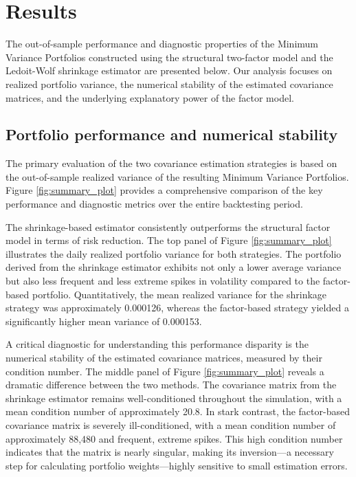 \documentclass[]{article}
\begin{document}
\section{Results}
\label{sec:results}
The out-of-sample performance and diagnostic properties of the Minimum Variance Portfolios constructed using the structural two-factor model and the Ledoit-Wolf shrinkage estimator are presented below. Our analysis focuses on realized portfolio variance, the numerical stability of the estimated covariance matrices, and the underlying explanatory power of the factor model.

\subsection{Portfolio performance and numerical stability}
The primary evaluation of the two covariance estimation strategies is based on the out-of-sample realized variance of the resulting Minimum Variance Portfolios. Figure \ref{fig:summary_plot} provides a comprehensive comparison of the key performance and diagnostic metrics over the entire backtesting period.

The shrinkage-based estimator consistently outperforms the structural factor model in terms of risk reduction. The top panel of Figure \ref{fig:summary_plot} illustrates the daily realized portfolio variance for both strategies. The portfolio derived from the shrinkage estimator exhibits not only a lower average variance but also less frequent and less extreme spikes in volatility compared to the factor-based portfolio. Quantitatively, the mean realized variance for the shrinkage strategy was approximately 0.000126, whereas the factor-based strategy yielded a significantly higher mean variance of 0.000153.

A critical diagnostic for understanding this performance disparity is the numerical stability of the estimated covariance matrices, measured by their condition number. The middle panel of Figure \ref{fig:summary_plot} reveals a dramatic difference between the two methods. The covariance matrix from the shrinkage estimator remains well-conditioned throughout the simulation, with a mean condition number of approximately 20.8. In stark contrast, the factor-based covariance matrix is severely ill-conditioned, with a mean condition number of approximately 88,480 and frequent, extreme spikes. This high condition number indicates that the matrix is nearly singular, making its inversion—a necessary step for calculating portfolio weights—highly sensitive to small estimation errors.
\end{document}
